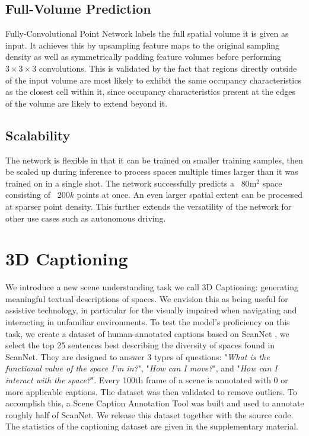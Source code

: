 \documentclass[runningheads]{llncs}
\begin{document}
\subsection{Full-Volume Prediction}

Fully-Convolutional Point Network labels the full spatial volume it is given as input. It achieves this by upsampling feature maps to the original sampling density as well as symmetrically padding feature volumes before performing $3\times 3\times 3$ convolutions. This is validated by the fact that regions directly outside of the input volume are most likely to exhibit the same occupancy characteristics as the closest cell within it, since occupancy characteristics present at the edges of the volume are likely to extend beyond it.

\subsection{Scalability}

The network is flexible in that it can be trained on smaller training samples, then be scaled up during inference to process spaces multiple times larger than it was trained on in a single shot. The network successfully predicts a ~$80$m$^2$ space consisting of ~$200k$ points at once. An even larger spatial extent can be processed at sparser point density. This further extends the versatility of the network for other use cases such as autonomous driving.

\section{3D Captioning}
\label{section:Captioning}

We introduce a new scene understanding task we call 3D Captioning: generating meaningful textual descriptions of spaces. We envision this as being useful for assistive technology, in particular for the visually impaired when navigating and interacting in unfamiliar environments. To test the model's proficiency on this task, we create a dataset of human-annotated captions based on ScanNet \cite{Dai2017}, we select the top 25 sentences best describing the diversity of spaces found in ScanNet. They are designed to answer 3 types of questions: "\textit{What is the functional value of the space I'm in?}", "\textit{How can I move?}", and "\textit{How can I interact with the space?}". Every 100th frame of a scene is annotated with 0 or more applicable captions. The dataset was then validated to remove outliers. To accomplish this, a Scene Caption Annotation Tool was built and used to annotate roughly half of ScanNet. We release this dataset together with the source code. The statistics of the captioning dataset are given in the supplementary material. %
\end{document}
